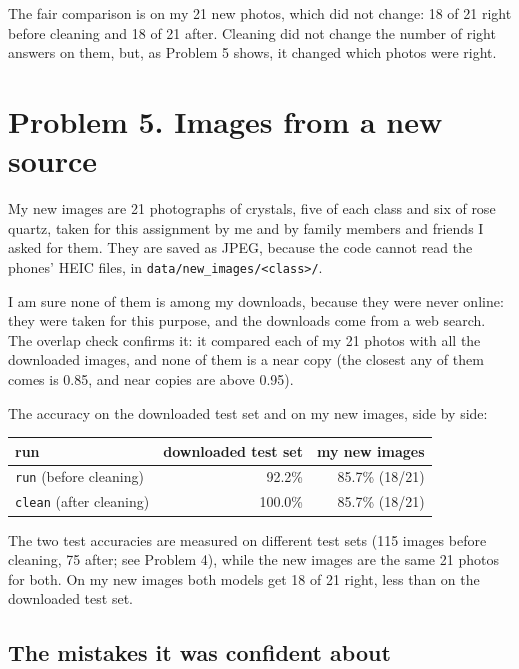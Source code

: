 \documentclass[11pt]{article}
\begin{document}
The fair comparison is on my 21 new photos, which did not change: 18 of 21 right
before cleaning and 18 of 21 after. Cleaning did not change the number of right
answers on them, but, as Problem 5 shows, it changed which photos were right.

\section*{Problem 5. Images from a new source}

My new images are 21 photographs of crystals, five of each class and six of rose
quartz, taken for this assignment by me and by family members and friends I asked
for them. They are saved as JPEG, because the code cannot read the phones' HEIC
files, in \texttt{data/new\_images/<class>/}.

I am sure none of them is among my downloads, because they were never online:
they were taken for this purpose, and the downloads come from a web search. The
overlap check confirms it: it compared each of my 21 photos with all the
downloaded images, and none of them is a near copy (the closest any of them comes
is 0.85, and near copies are above 0.95).


The accuracy on the downloaded test set and on my new images, side by side:

\begin{center}\footnotesize
\begin{tabular}{lrr}
\toprule
run & downloaded test set & my new images \\
\midrule
\texttt{run} (before cleaning) & 92.2\% & 85.7\% (18/21) \\
\texttt{clean} (after cleaning) & 100.0\% & 85.7\% (18/21) \\
\bottomrule
\end{tabular}
\end{center}

The two test accuracies are measured on different test sets (115 images before
cleaning, 75 after; see Problem 4), while the new images are the same 21 photos
for both. On my new images both models get 18 of 21 right, less than on the
downloaded test set.

\subsection*{The mistakes it was confident about}
\end{document}

